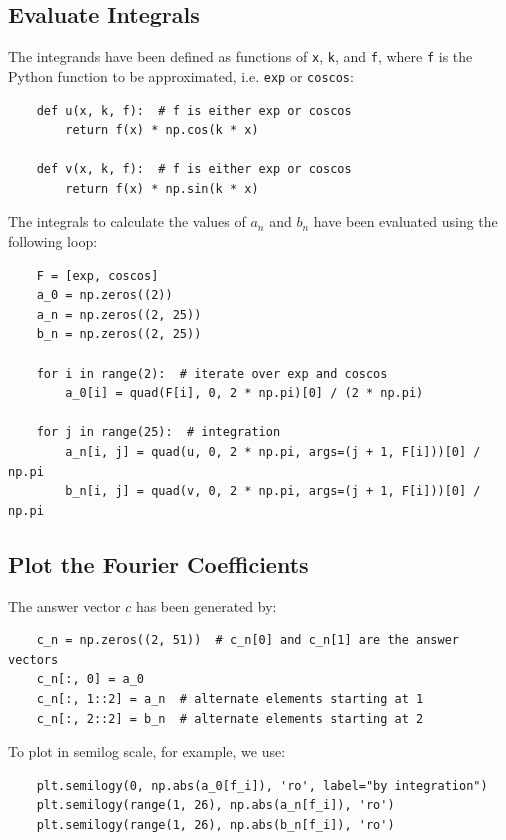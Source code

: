 \documentclass[12pt, a4paper]{article}
\newcommand{\code}{\lstinline[basicstyle=\small]}
\begin{document}
\subsection{Evaluate Integrals}
The integrands have been defined as functions of \code{x}, \code{k}, and \code{f}, where
\code{f} is the Python function to be approximated, i.e. \code{exp} or \code{coscos}:
\begin{lstlisting}
    def u(x, k, f):  # f is either exp or coscos
        return f(x) * np.cos(k * x)

    def v(x, k, f):  # f is either exp or coscos
        return f(x) * np.sin(k * x)
\end{lstlisting}
The integrals to calculate the values of $a_n$ and $b_n$ have been evaluated using the following loop:
\begin{lstlisting}
    F = [exp, coscos]
    a_0 = np.zeros((2))
    a_n = np.zeros((2, 25))
    b_n = np.zeros((2, 25))

    for i in range(2):  # iterate over exp and coscos
        a_0[i] = quad(F[i], 0, 2 * np.pi)[0] / (2 * np.pi)

    for j in range(25):  # integration
        a_n[i, j] = quad(u, 0, 2 * np.pi, args=(j + 1, F[i]))[0] / np.pi
        b_n[i, j] = quad(v, 0, 2 * np.pi, args=(j + 1, F[i]))[0] / np.pi
\end{lstlisting}


\subsection{Plot the Fourier Coefficients}
The answer vector $c$ has been generated by:
\begin{lstlisting}
    c_n = np.zeros((2, 51))  # c_n[0] and c_n[1] are the answer vectors
    c_n[:, 0] = a_0
    c_n[:, 1::2] = a_n  # alternate elements starting at 1
    c_n[:, 2::2] = b_n  # alternate elements starting at 2    
\end{lstlisting}

To plot in semilog scale, for example, we use:
\begin{lstlisting}
    plt.semilogy(0, np.abs(a_0[f_i]), 'ro', label="by integration")
    plt.semilogy(range(1, 26), np.abs(a_n[f_i]), 'ro')
    plt.semilogy(range(1, 26), np.abs(b_n[f_i]), 'ro')
\end{lstlisting}
\end{document}
